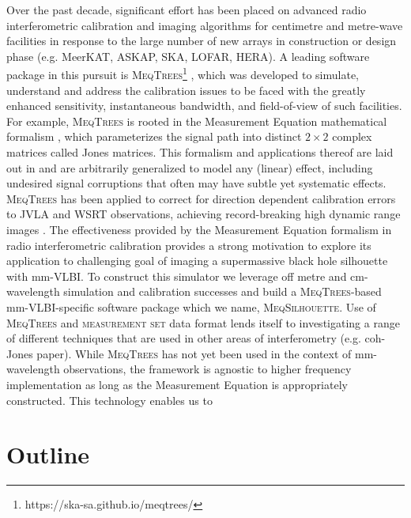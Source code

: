 Over the past decade, significant effort has been placed on advanced radio interferometric calibration and imaging algorithms for centimetre and metre-wave facilities in response to the large number of new arrays in construction or design phase (e.g. MeerKAT, ASKAP, SKA, LOFAR, HERA). A leading software package in this pursuit is \textsc{MeqTrees}\footnote{https://ska-sa.github.io/meqtrees/} \citep*{Noordam_2010}, which was developed to simulate, understand and address the calibration issues to be faced with the greatly enhanced sensitivity, instantaneous bandwidth, and field-of-view of such facilities. For example, \textsc{MeqTrees} is rooted in the Measurement Equation mathematical formalism \citep{Hamaker_1996}, which parameterizes the signal path into distinct $2 \times 2$ complex  matrices called Jones matrices. This formalism and applications thereof are laid out in \citep{Smirnov_2011a,Smirnov_2011b,Smirnov_2011c} and are arbitrarily generalized to model any (linear) effect, including undesired signal corruptions that often may have subtle yet systematic effects. \textsc{MeqTrees} has been applied to correct for direction dependent calibration errors to JVLA and WSRT observations, achieving record-breaking high dynamic range images \citep{Smirnov_2011c}. The effectiveness provided by the Measurement Equation formalism in radio interferometric calibration provides a strong motivation to explore its application to challenging goal of imaging a supermassive black hole silhouette with mm-VLBI. To construct this simulator we leverage off metre and cm-wavelength simulation and calibration successes and build a \textsc{MeqTrees}-based mm-VLBI-specific software package which we name, \textsc{MeqSilhouette}.  Use of \textsc{MeqTrees} and \textsc{measurement set} data format lends itself to investigating a range of different techniques that are used in other areas of interferometry (e.g. coh-Jones paper). While \textsc{MeqTrees} has not yet been used in the context of mm-wavelength observations, the framework is agnostic to higher frequency implementation as long as the Measurement Equation is appropriately constructed. This technology enables us to


\section{Outline}



















